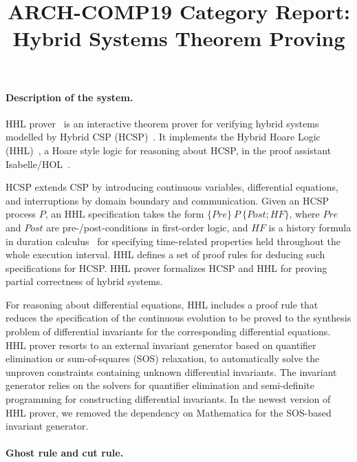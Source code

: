 \documentclass[runningheads,a4paper]{llncs}
\begin{document}
\author{}
\institute{}

\title{ARCH-COMP19 Category Report: Hybrid Systems Theorem Proving}

\maketitle

\paragraph{Description of the system.}

HHL prover~\cite{WZZ15} is an interactive theorem prover for verifying
hybrid systems modelled by Hybrid CSP (HCSP)~\cite{He94,ZWR96}. It
implements the Hybrid Hoare Logic (HHL)~\cite{LLQZ10}, a Hoare style
logic for reasoning about HCSP, in the proof assistant
Isabelle/HOL~\cite{isabelle}.

HCSP extends CSP by introducing continuous variables, differential
equations, and interruptions by domain boundary and
communication. Given an HCSP process $P$, an HHL specification takes
the form $\{\mathit{Pre}\}~P~\{\mathit{Post}; \mathit{HF}\}$, where
$\mathit{Pre}$ and $\mathit{Post}$ are pre-/post-conditions in
first-order logic, and $\mathit{HF}$ is a history formula in duration
calculus~\cite{ZH04} for specifying time-related properties held
throughout the whole execution interval. HHL defines a set of proof
rules for deducing such specifications for HCSP. HHL prover formalizes
HCSP and HHL for proving partial correctness of hybrid systems.

For reasoning about differential equations, HHL includes a proof rule
that reduces the specification of the continuous evolution to be
proved to the synthesis problem of differential invariants for the
corresponding differential equations. HHL prover resorts to an
external invariant generator based on quantifier elimination or
sum-of-squares (SOS) relaxation, to automatically solve the unproven
constraints containing unknown differential invariants. The invariant
generator relies on the solvers for quantifier elimination and
semi-definite programming for constructing differential invariants. In
the newest version of HHL prover, we removed the dependency on
Mathematica for the SOS-based invariant generator.

\paragraph{Ghost rule and cut rule.}
\end{document}
